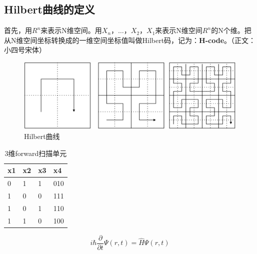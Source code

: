\documentclass[UTF-8,notitlepage,onecolumn,oneside]{article}
\begin{document}
	\subsection{Hilbert曲线的定义\vspace{-0.5em}}
		首先，用$R^n$来表示N维空间。用$X_n，…，X_2，X_1$来表示N维空间$R^n$的N个维。把从N维空间坐标转换成的一维空间坐标值叫做Hilbert码，记为：\textbf{H-code}。（正文：小四号宋体）
		\begin{figure}[htbp]
		\centering
		\includegraphics[scale=0.8]{pic.png}
		\vspace{-2ex}
		\caption{Hilbert曲线}
		\label{fig:Hilbert}
		\end{figure}
	\vspace{-4ex}
	\begin{table}[htbp]
		\caption{3维forward扫描单元}
		\vspace{1ex}
		\centering
		\begin{tabular}{llll}
			\toprule
			x1 & x2 & x3 & x4     \\ 
			\midrule[0.25ex]
			0  & 1  & 1  & 010    \\
			1  & 0  & 0  & 111    \\
			1  & 0  & 1  & 110    \\ 
			1  & 1  & 0  & 100    \\ 
			\bottomrule
		\end{tabular}
	\end{table}
	\vspace{-3ex}
	\begin{equation}\label{eq:1}
		i\hbar \frac{\partial}{\partial t}\Psi \left( r,t \right) =\hat{H}\Psi \left( r,t \right)
	\end{equation}
		
	\begin{spacing}{1}
		\small
	
	
	\end{spacing}
\end{document}
